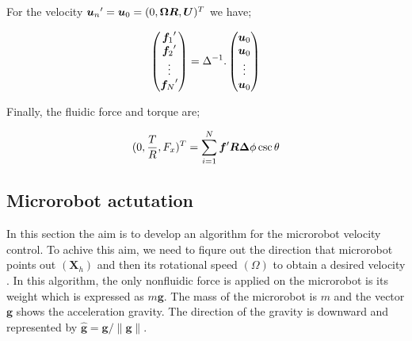 \documentclass[12pt,a4paper,titlepage]{report}
\begin{document}
For the velocity ${\bm{u}_n}\rq{} = {\bm{u}_0} = (0, \bm{\Omega} \bm{R}, \bm{U})^T$ we have;



\begin{equation}
\begin{pmatrix}
  {\bm{f}_1}\rq{}  \\
  {\bm{f}_2}\rq{} \\
  \vdots  \\
   {\bm{f}_N}\rq{} 
 \end{pmatrix} = {\Delta}^{-1}. \begin{pmatrix}
  {\bm{u}_0}  \\
  {\bm{u}_0} \\
  \vdots  \\
   {\bm{u}_0} 
 \end{pmatrix}
\label{mappingInverse}
\end{equation}


Finally, the fluidic force and torque are;



\begin{equation}
 (0, \frac{T}{R}, F_x)^T = \sum_{i=1}^{N} \bm{f}\rq{} \bm{R} \bm{\Delta}\phi \csc \theta
\label{torqForce}
\end{equation}













\subsection{Microrobot actutation}\label{microActuation}





In this section the aim is to develop an algorithm for the microrobot velocity control. To achive this aim, we need to 
fiqure out the direction that microrobot points out $(\bm{X}_{h})$ and then its rotational speed $(\Omega)$
 to obtain a desired velocity \cite{mahoney2011velocity}.
In this algorithm, the only nonfluidic force is applied on the microrobot is its weight which is expressed as 
$m\bm{g}$. The mass of the microrobot is $m$ and the vector $\bm{g}$ shows the acceleration gravity. 
The direction of the gravity is downward and represented by $\hat{ \bm{g} }= \bm{g}/ \| \bm{g}\|$.
\end{document}

